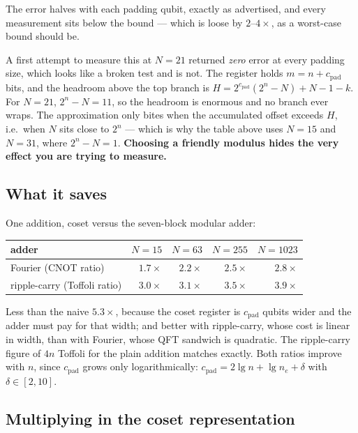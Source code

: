\documentclass[11pt]{article}
\theoremstyle{plain}
\theoremstyle{remark}
\begin{document}
\noindent
The error halves with each padding qubit, exactly as advertised, and every measurement sits below
the bound --- which is loose by $2$--$4\times$, as a worst-case bound should be.

\begin{keybox}[title={Where the approximation actually bites}]
A first attempt to measure this at $N=21$ returned \emph{zero} error at every padding size, which
looks like a broken test and is not. The register holds $m=n+c_{\mathrm{pad}}$ bits, and the
headroom above the top branch is
$H=2^{c_{\mathrm{pad}}}(2^n-N)+N-1-k$. For $N=21$, $2^n-N=11$, so the headroom is enormous and no
branch ever wraps. The approximation only bites when the accumulated offset exceeds $H$, i.e.\ when
$N$ sits close to $2^n$ --- which is why the table above uses $N=15$ and $N=31$, where
$2^n-N=1$. \textbf{Choosing a friendly modulus hides the very effect you are trying to measure.}
\end{keybox}

\subsection{What it saves}

One addition, coset versus the seven-block modular adder:

\begin{center}\small
\begin{tabular}{@{}lrrrr@{}}
\toprule
adder & $N=15$ & $N=63$ & $N=255$ & $N=1023$\\
\midrule
Fourier (CNOT ratio)      & $1.7\times$ & $2.2\times$ & $2.5\times$ & $2.8\times$\\
ripple-carry (Toffoli ratio) & $3.0\times$ & $3.1\times$ & $3.5\times$ & $3.9\times$\\
\bottomrule
\end{tabular}
\end{center}

\noindent
Less than the naive $5.3\times$, because the coset register is $c_{\mathrm{pad}}$ qubits wider and
the adder must pay for that width; and better with ripple-carry, whose cost is linear in width,
than with Fourier, whose QFT sandwich is quadratic. The ripple-carry figure of $4n$ Toffoli for the
plain addition matches \cite{gidney-ekera} exactly. Both ratios improve with $n$, since
$c_{\mathrm{pad}}$ grows only logarithmically: $c_{\mathrm{pad}}=2\lg n+\lg n_e+\delta$ with
$\delta\in[2,10]$.

\subsection{Multiplying in the coset representation}
\end{document}
